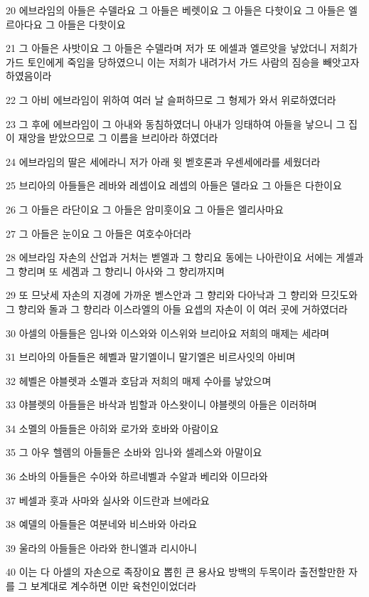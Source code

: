 \par 20 에브라임의 아들은 수델라요 그 아들은 베렛이요 그 아들은 다핫이요 그 아들은 엘르아다요 그 아들은 다핫이요
\par 21 그 아들은 사밧이요 그 아들은 수델라며 저가 또 에셀과 엘르앗을 낳았더니 저희가 가드 토인에게 죽임을 당하였으니 이는 저희가 내려가서 가드 사람의 짐승을 빼앗고자 하였음이라
\par 22 그 아비 에브라임이 위하여 여러 날 슬퍼하므로 그 형제가 와서 위로하였더라
\par 23 그 후에 에브라임이 그 아내와 동침하였더니 아내가 잉태하여 아들을 낳으니 그 집이 재앙을 받았으므로 그 이름을 브리아라 하였더라
\par 24 에브라임의 딸은 세에라니 저가 아래 윗 벧호론과 우센세에라를 세웠더라
\par 25 브리아의 아들들은 레바와 레셉이요 레셉의 아들은 델라요 그 아들은 다한이요
\par 26 그 아들은 라단이요 그 아들은 암미훗이요 그 아들은 엘리사마요
\par 27 그 아들은 눈이요 그 아들은 여호수아더라
\par 28 에브라임 자손의 산업과 거처는 벧엘과 그 향리요 동에는 나아란이요 서에는 게셀과 그 향리며 또 세겜과 그 향리니 아사와 그 향리까지며
\par 29 또 므낫세 자손의 지경에 가까운 벧스안과 그 향리와 다아낙과 그 향리와 므깃도와 그 향리와 돌과 그 향리라 이스라엘의 아들 요셉의 자손이 이 여러 곳에 거하였더라
\par 30 아셀의 아들들은 임나와 이스와와 이스위와 브리아요 저희의 매제는 세라며
\par 31 브리아의 아들들은 헤벨과 말기엘이니 말기엘은 비르사잇의 아비며
\par 32 헤벨은 야블렛과 소멜과 호담과 저희의 매제 수아를 낳았으며
\par 33 야블렛의 아들들은 바삭과 빔할과 아스왓이니 야블렛의 아들은 이러하며
\par 34 소멜의 아들들은 아히와 로가와 호바와 아람이요
\par 35 그 아우 헬렘의 아들들은 소바와 임나와 셀레스와 아말이요
\par 36 소바의 아들들은 수아와 하르네벨과 수알과 베리와 이므라와
\par 37 베셀과 훗과 사마와 실사와 이드란과 브에라요
\par 38 예델의 아들들은 여분네와 비스바와 아라요
\par 39 울라의 아들들은 아라와 한니엘과 리시아니
\par 40 이는 다 아셀의 자손으로 족장이요 뽑힌 큰 용사요 방백의 두목이라 출전할만한 자를 그 보계대로 계수하면 이만 육천인이었더라


